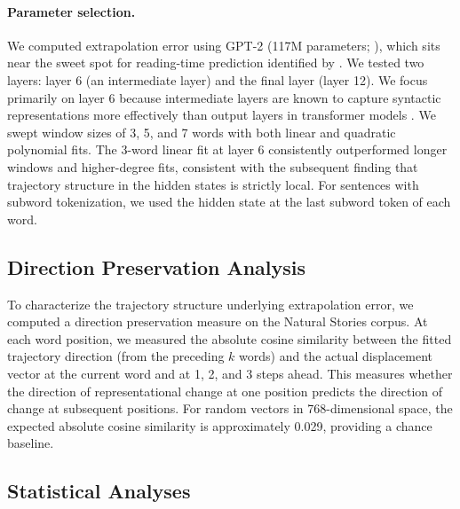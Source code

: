 \documentclass[12pt]{article}
\begin{document}
\paragraph{Parameter selection.} We computed extrapolation error using GPT-2 (117M parameters; \citealp{radford2019}), which sits near the sweet spot for reading-time prediction identified by \citet{oh2023a}. We tested two layers: layer 6 (an intermediate layer) and the final layer (layer 12). We focus primarily on layer 6 because intermediate layers are known to capture syntactic representations more effectively than output layers in transformer models \citep{hewitt2019,jawahar2019}. We swept window sizes of 3, 5, and 7 words with both linear and quadratic polynomial fits. The 3-word linear fit at layer 6 consistently outperformed longer windows and higher-degree fits, consistent with the subsequent finding that trajectory structure in the hidden states is strictly local. For sentences with subword tokenization, we used the hidden state at the last subword token of each word.

\subsection{Direction Preservation Analysis}

To characterize the trajectory structure underlying extrapolation error, we computed a direction preservation measure on the Natural Stories corpus. At each word position, we measured the absolute cosine similarity between the fitted trajectory direction (from the preceding $k$ words) and the actual displacement vector at the current word and at 1, 2, and 3 steps ahead. This measures whether the direction of representational change at one position predicts the direction of change at subsequent positions. For random vectors in 768-dimensional space, the expected absolute cosine similarity is approximately 0.029, providing a chance baseline.

\subsection{Statistical Analyses}
\end{document}

